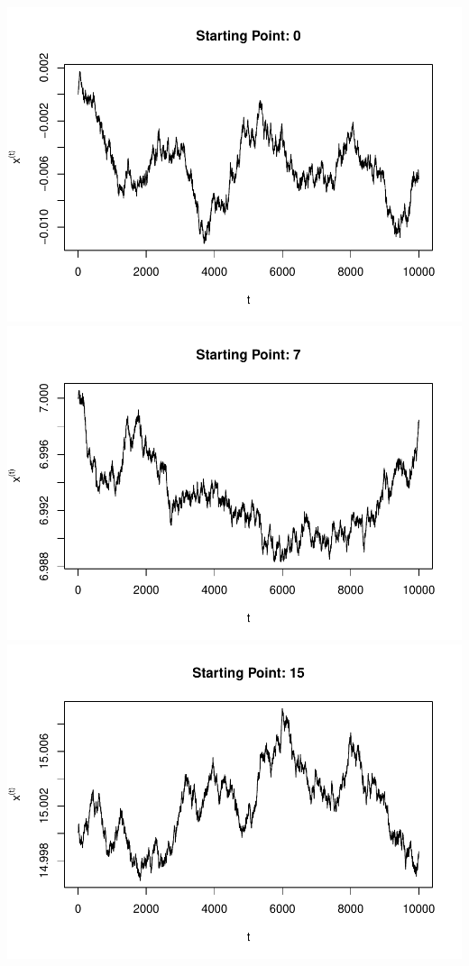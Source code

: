 \documentclass[]{article}
\begin{document}
\includegraphics{Atlas-PS_5_files/figure-latex/unnamed-chunk-4-1.pdf}
\includegraphics{Atlas-PS_5_files/figure-latex/unnamed-chunk-4-2.pdf}
\includegraphics{Atlas-PS_5_files/figure-latex/unnamed-chunk-4-3.pdf}
\end{document}
